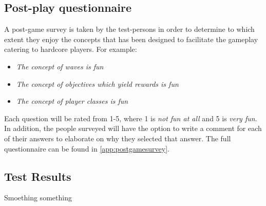 \subsection{Post-play questionnaire}
A post-game survey is taken by the test-persons in order to determine to which extent they enjoy the concepts that has been designed to facilitate the gameplay catering to hardcore players.
For example:
\begin{itemize}
\item \emph{The concept of waves is fun}
\item \emph{The concept of objectives which yield rewards is fun}
\item \emph{The concept of player classes is fun}
\end{itemize}

Each question will be rated from 1-5, where 1 is \emph{not fun at all} and 5 is \emph{very fun}.
In addition, the people surveyed will have the option to write a comment for each of their answers to elaborate on why they selected that answer.
The full questionnaire can be found in \ref{app:postgamesurvey}.

\subsection{Test Results}
Smoething something
